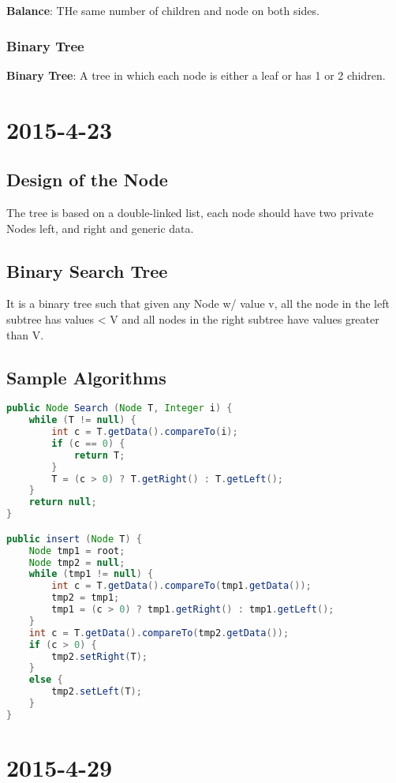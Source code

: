 \documentclass [12 pt, twoside] {article}
\begin{document}
\textbf{Balance}: THe same number of children and node on both sides.

\subsubsection{Binary Tree}
\textbf{Binary Tree}: A tree in which each node is either a leaf or has 1 or 2
chidren.

\section{2015-4-23}
\subsection{Design of the Node}

The tree is based on a double-linked list, each node should have two private
Nodes left, and right and generic data.

\subsection{Binary Search Tree}

It is a binary tree such that given any Node w/ value v, all the node in the
left subtree has values < V and all nodes in the right subtree have values
greater than V.

\subsection{Sample Algorithms}
\begin{lstlisting}[language=java]
public Node Search (Node T, Integer i) {
    while (T != null) {
        int c = T.getData().compareTo(i);
        if (c == 0) {
            return T;
        }
        T = (c > 0) ? T.getRight() : T.getLeft();
    }
    return null;
}

public insert (Node T) {
    Node tmp1 = root;
    Node tmp2 = null;
    while (tmp1 != null) {
        int c = T.getData().compareTo(tmp1.getData());
        tmp2 = tmp1;
        tmp1 = (c > 0) ? tmp1.getRight() : tmp1.getLeft();
    }
    int c = T.getData().compareTo(tmp2.getData());
    if (c > 0) {
        tmp2.setRight(T);
    }
    else {
        tmp2.setLeft(T);
    }
}
\end{lstlisting}

\section{2015-4-29}
\end{document}
